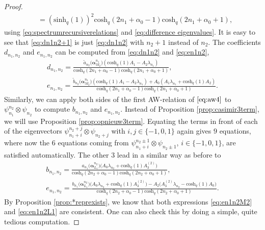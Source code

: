 \documentclass[pdftex]{sigma}
\numberwithin{equation}{section}
\newcommand{\chq}{\mathrm{cosh}_q}
\newcommand{\shq}{\mathrm{sinh}_q}
\begin{document}
\begin{proof}
\begin{align*}
& = (\shq(1))^2\chq(2n_1+\alpha_0-1)\chq(2n_1+\alpha_0+1),
	\end{align*}
	using \eqref{eq:spectrumrecursiverelations} and \eqref{eq:difference eigenvalues}. It is easy to see that \eqref{eq:dn1n2+1} is just \eqref{eq:dn1n2} with $n_2+1$ instead of $n_2$. The coefficients $d_{n_1,n_2}$ and $e_{n_1,n_2}$ can be computed from \eqref{eq:dn1n2} and \eqref{eq:en1n2},
	\begin{gather}
		d_{n_1,n_2} = \frac{\tilde{a}_{n_2}\big(\bm{\alpha}_{M_2}^{n_1}\big) (\chq(1)A_1-A_2\lambda_{n_1})}{\chq(2n_1+\alpha_0-1)\chq(2n_1+\alpha_0+1)},\nonumber\\
		e_{n_1,n_2} = \frac{\tilde{b}_{n_2}\big(\bm{\alpha}_{M_2}^{n_1}\big) (\chq(1)A_1-A_2\lambda_{n_1} )+A_0 (A_1\lambda_{n_1}+\chq(1)A_2 )}{\chq(2n_1+\alpha_0-1)\chq(2n_1+\alpha_0+1)}.\label{eq:en1n2M2}
	\end{gather}
	Similarly, we can apply both sides of the first AW-relation of $\eqref{eq:aw4}$ to $\psi_{n_1}^{n_2}\otimes \psi_{n_2}$ to compute $b_{n_1,n_2}$ and $e_{n_1,n_2}$. Instead of Proposition \ref{prop:casimir3term}, we will use Proposition \ref{prop:opnieuw3term}. Equating the terms in front of each of the eigenvectors $\psi_{n_1+i}^{n_2+j}\otimes \psi_{n_2+j}$ with $i,j\in\{-1,0,1\}$ again gives $9$ equations, where now the $6$ equations coming from $\psi_{n_1+ i}^{n_2\pm 1}\otimes \psi_{n_2\pm 1}$, $i\in\{-1,0,1\}$, are satisfied automatically. The other 3 lead in a similar way as before to
	\begin{gather}
		b_{n_1,n_2} = \frac{a_{n_1}\big(\bm{\alpha}_{L_1}^{n_2}\big)\big(A_0\lambda_{n_2} +\chq(1)A_3^{(2)}\big)}{\chq(2n_2+\alpha_0-1)\chq(2n_2+\alpha_0+1)},\nonumber\\
		e_{n_1,n_2} = \frac{b_{n_1}\big(\bm{\alpha}_{L_1}^{n_2}\big)\big(A_0\lambda_{n_2} +\chq(1)A_3^{(2)}\big)-A_2\big(A_3^{(2)}\lambda_{n_2}-\chq(1)A_0\big)}{\chq(2n_2+\alpha_0-1)\chq(2n_2+\alpha_0+1)}.\label{eq:en1n2L1}
	\end{gather}
By Proposition \ref{prop:*reprexists}, we know that both expressions \eqref{eq:en1n2M2} and \eqref{eq:en1n2L1} are consistent. One can also check this by doing a simple, quite tedious computation.
	

\end{proof}
\end{document}
